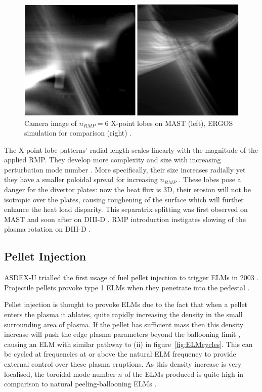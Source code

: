 \documentclass[11pt, twocolumn]{article}  %
\begin{document}
\begin{figure}
\includegraphics[scale=0.5]{Figures/lobes.PNG}
\centering
\caption{Camera image of $n_{RMP}=6$ X-point lobes on MAST (left), ERGOS simulation for comparison (right) \cite{Harrison2014}.}\label{fig:lobes}
\end{figure}

The X-point lobe patterns' radial length scales linearly with the magnitude of the applied RMP. They develop more complexity and size with increasing perturbation mode number \cite{Harrison2014}. More specifically, their size increases radially yet they have a smaller poloidal spread for increasing $n_{RMP}$ \cite{Chapman2014}. These lobes pose a danger for the divertor plates: now the heat flux is 3D, their erosion will not be isotropic over the plates, causing roughening of the surface which will further enhance the heat load disparity. This separatrix splitting was first observed on MAST \cite{Kirk2012} and soon after on DIII-D \cite{Shafer2012}. RMP introduction instigates slowing of the plasma rotation on DIII-D \cite{Kirk2013}.

\subsection{Pellet Injection}\label{ssec:PInjection}
ASDEX-U trialled the first usage of fuel pellet injection to trigger ELMs in 2003 \cite{Lang2003}. Projectile pellets provoke type 1 ELMs when they penetrate into the pedestal \cite{KirkFF}. 

Pellet injection is thought to provoke ELMs due to the fact that when a pellet enters the plasma it ablates, quite rapidly increasing the density in the small surrounding area of plasma. If the pellet has sufficient mass then this density increase will push the edge plasma parameters beyond the ballooning limit \cite{Baylor2015}, causing an ELM with similar pathway to (ii) in figure~\ref{fig:ELMcycles}. This can be cycled at frequencies at or above the natural ELM frequency to provide external control over these plasma eruptions. As this density increase is very localised, the toroidal mode number $n$ of the ELMs produced is quite high in comparison to natural peeling-ballooning ELMs \cite{Baylor2015}.
\end{document}
